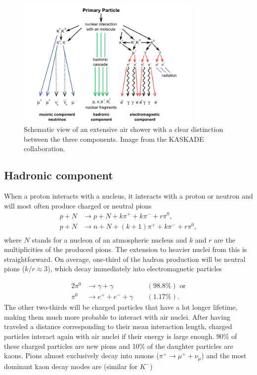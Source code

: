 \begin{figure}
\centering
\includegraphics[width=0.8\textwidth]{chapter3/img/airshower.png}
\caption{Schematic view of an extensive air shower with a clear distinction between the three components. Image from the KASKADE collaboration.}
\label{fig:airshower}
\end{figure} 

\subsection{Hadronic component}
When a proton interacts with a nucleus, it interacts with a proton or neutron and will most often produce charged or neutral pions
\begin{equation}
\begin{split}
p+N &\rightarrow p+N + k\pi^+ + k\pi^- +r\pi^0,\\
p+N &\rightarrow n+N + (k+1)\pi^+ + k\pi^- + r\pi^0,\\
\end{split}
\end{equation}
where $N$ stands for a nucleon of an atmospheric nucleus and $k$ and $r$ are the multiplicities of the produced pions. The extension to heavier nuclei from this is straightforward. On average, one-third of the hadron production will be neutral pions ($k/r \approx 3$), which decay immediately into electromagnetic particles 

\begin{alignat}{2}
\pi^0 &\rightarrow \gamma  +\gamma &&(98.8\%) \textrm{ or}\\
\pi^0 &\rightarrow e^+ + e^- + \gamma \ \ &&(1.17\%).
\end{alignat}
The other two-thirds will be charged particles that have a lot longer lifetime, making them much more probable to interact with air nuclei. After having traveled a distance corresponding to their mean interaction length, charged particles interact again with air nuclei if their energy is large enough. 90\% of these charged particles are new pions and 10\% of the daughter particles are kaons. Pions almost exclusively decay into muons ($\pi^+ \rightarrow \mu^+ + \nu_{\mu}$) and the most dominant kaon decay modes are (similar for $K^-$) \cite{PDG2018url}

